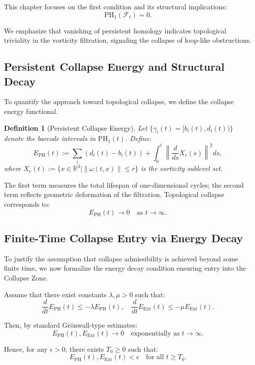 \documentclass[11pt]{article}
\newtheorem{definition}[theorem]{Definition}
\begin{document}
This chapter focuses on the first condition and its structural implications:
\[
\mathrm{PH}_1(\mathcal{F}_t) = 0.
\]

We emphasize that vanishing of persistent homology indicates topological triviality in the vorticity filtration, signaling the collapse of loop-like obstructions.

\subsection{Persistent Collapse Energy and Structural Decay}

To quantify the approach toward topological collapse, we define the collapse energy functional.

\begin{definition}[Persistent Collapse Energy]
Let \( \{ \gamma_i(t) = [b_i(t), d_i(t)) \} \) denote the barcode intervals in \( \mathrm{PH}_1(t) \). Define:
\begin{equation}
E_{\mathrm{PH}}(t) := \sum_i \left( d_i(t) - b_i(t) \right)
+ \int_0^t \left\| \frac{d}{ds} X_r(s) \right\|^2 ds,
\end{equation}
where \( X_r(t) := \{ x \in \mathbb{R}^3 \mid \|\omega(t,x)\| \leq r \} \) is the vorticity sublevel set.
\end{definition}

The first term measures the total lifespan of one-dimensional cycles; the second term reflects geometric deformation of the filtration. Topological collapse corresponds to:
\[
E_{\mathrm{PH}}(t) \to 0 \quad \text{as } t \to \infty.
\]

\subsection{Finite-Time Collapse Entry via Energy Decay}

To justify the assumption that collapse admissibility is achieved beyond some finite time, we now formalize the energy decay condition ensuring entry into the Collapse Zone.

Assume that there exist constants \( \lambda, \mu > 0 \) such that:
\[
\frac{d}{dt} E_{\mathrm{PH}}(t) \leq -\lambda E_{\mathrm{PH}}(t), \quad
\frac{d}{dt} E_{\mathrm{Ext}}(t) \leq -\mu E_{\mathrm{Ext}}(t).
\]

Then, by standard Grönwall-type estimates:
\[
E_{\mathrm{PH}}(t), E_{\mathrm{Ext}}(t) \to 0 \quad \text{exponentially as } t \to \infty.
\]

Hence, for any \( \epsilon > 0 \), there exists \( T_0 \geq 0 \) such that:
\[
E_{\mathrm{PH}}(t), E_{\mathrm{Ext}}(t) < \epsilon \quad \text{for all } t \geq T_0.
\]
\end{document}
